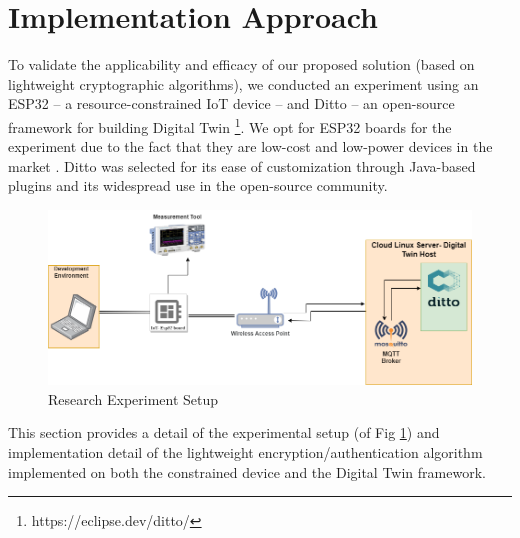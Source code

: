 

\section{Implementation Approach}
To validate the applicability and efficacy of our proposed solution (based on lightweight cryptographic algorithms), we conducted an experiment using an ESP32 -- a resource-constrained IoT device -- and Ditto -- an open-source framework for building Digital Twin \footnote{https://eclipse.dev/ditto/}. We opt for ESP32 boards for the experiment due to the fact that they are low-cost and low-power devices in the market \cite{maier_comparative_2017}. Ditto was selected for its ease of customization through Java-based plugins and its widespread use in the open-source community. 



\begin{figure}[H]
    \centering
    \includegraphics[width=\textwidth]{images/fp/experiment.drawio.png}
    \caption{Research Experiment Setup}
    \label{fig:experiment-setup}
\end{figure}

This section provides a detail of the experimental setup (of Fig \ref{fig:experiment-setup}) and implementation detail of the lightweight encryption/authentication algorithm implemented on both the constrained device and the Digital Twin framework.











